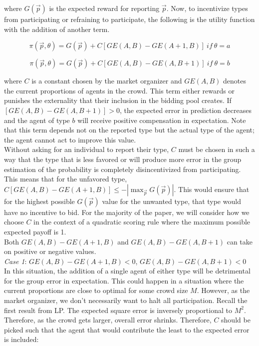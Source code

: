 \documentclass[twoside,twocolumn]{article}
\begin{document}
where $G(\vec{p})$ is the expected reward for reporting $\vec{p}$. Now, to incentivize types from participating or refraining to participate, the following is the utility function with the addition of another term.

\begin{equation}
\label{strictutil1}
\pi(\vec{p}, \theta) = G(\vec{p}) + C[GE(A,B) - GE(A+1,B)] \ if \ \theta=a
\end{equation}

\begin{equation}
\label{strictutil2}
\pi(\vec{p}, \theta) = G(\vec{p}) + C[GE(A,B) - GE(A,B+1)] \ if \ \theta=b
\end{equation}

where $C$ is a constant chosen by the market organizer and $GE(A,B)$ denotes the current proportions of agents in the crowd. This term either rewards or punishes the externality that their inclusion in the bidding pool creates. If $[GE(A,B) - GE(A,B+1)] > 0$, the expected error in prediction decreases and the agent of type $b$ will receive positive compensation in expectation. Note that this term depends not on the reported type but the actual type of the agent; the agent cannot act to improve this value.\\

Without asking for an individual to report their type, $C$ must be chosen in such a way that the type that is less favored or will produce more error in the group estimation of the probability is completely disincentivized from participating. This means that for the unfavored type, $C[GE(A,B) - GE(A+1,B)] \leq -|\max_{\vec{p}}G(\vec{p})|$. This would ensure that for the highest possible $G(\vec{p})$ value for the unwanted type, that type would have no incentive to bid. For the majority of the paper, we will consider how we choose $C$ in the context of a quadratic scoring rule where the maximum possible expected payoff is 1.\\

Both $GE(A,B) - GE(A+1,B)$ and $GE(A,B) - GE(A,B+1)$ can take on positive or negative values. \\

\textit{Case 1}: $GE(A,B) - GE(A+1,B) < 0$, $GE(A,B) - GE(A,B+1) < 0$\\

In this situation, the addition of a single agent of either type will be detrimental for the group error in expectation. This could happen in a situation where the current proportions are close to optimal for some crowd size $M$. However, as the market organizer, we don't necessarily want to halt all participation. Recall the first result from LP. The expected square error is inversely proportional to $M^2$. Therefore, as the crowd gets larger, overall error shrinks. Therefore, $C$ should be picked such that the agent that would contribute the least to the expected error is included:\\
\end{document}
